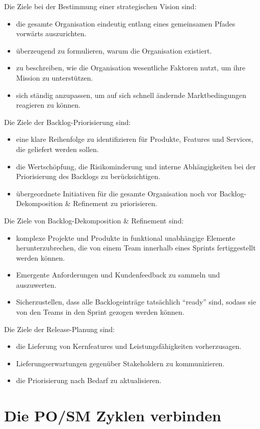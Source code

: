 \documentclass[12pt,a4paper,parskip=full]{scrartcl}
\begin{document}
Die Ziele bei der Bestimmung einer strategischen Vision sind:
\begin{itemize}
\item die gesamte Organisation eindeutig entlang eines gemeinsamen Pfades vorwärts auszurichten.
\item überzeugend zu formulieren, warum die Organisation existiert.
\item zu beschreiben, wie die Organisation wesentliche Faktoren nutzt, um ihre Mission zu unterstützen.
\item sich ständig anzupassen, um auf sich schnell ändernde Marktbedingungen reagieren zu können.
\end{itemize}
Die Ziele der Backlog-Priorisierung sind:
\begin{itemize}
\item eine klare Reihenfolge zu identifizieren für Produkte, Features und
Services, die geliefert werden sollen.
\item die Wertschöpfung, die Risikominderung und interne Abhängigkeiten bei der
Priorisierung des Backlogs zu berücksichtigen.
\item übergeordnete Initiativen für die gesamte Organisation noch vor Backlog-Dekomposition \& Refinement zu priorisieren.
\end{itemize}
Die Ziele von Backlog-Dekomposition \& Refinement sind:
\begin{itemize}
\item komplexe Projekte und Produkte in funktional unabhängige Elemente
herunterzubrechen, die von einem Team innerhalb eines Sprints fertiggestellt
werden können.
\item Emergente Anforderungen und Kundenfeedback zu sammeln und auszuwerten.
\item Sicherzustellen, dass alle Backlogeinträge tatsächlich ``ready'' sind,
sodass sie von den Teams in den Sprint gezogen werden können.
\end{itemize}
Die Ziele der Release-Planung sind:
\begin{itemize}
\item die Lieferung von Kernfeatures und Leistungsfähigkeiten vorherzusagen.
\item Lieferungserwartungen gegenüber Stakeholdern zu kommunizieren.
\item die Priorisierung nach Bedarf zu aktualisieren.
\end{itemize}

\section{Die PO/SM Zyklen verbinden}
\end{document}
